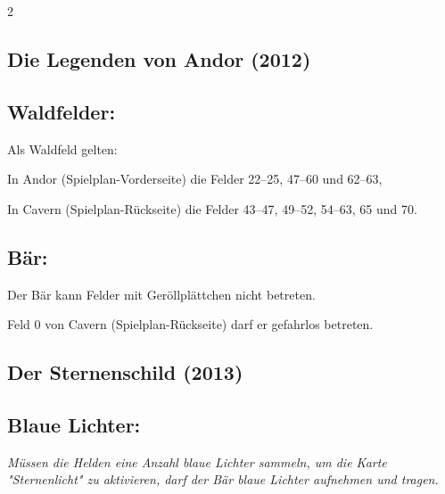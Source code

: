 \documentclass[10pt, a4paper, oneside]{book}
\newcommand{\fan}[1]{\textit{#1}}
\begin{document}
\begin{multicols*}{2}
\columnbreak



\begin{bgcolor}
\section{Die Legenden von Andor (2012)}





\subsection{Waldfelder:}

Als Waldfeld gelten:

\bullet{} In Andor (Spielplan-Vorderseite) die Felder 22–25, 47–60 und 62–63,
\supercite{232}

\bullet{} In Cavern (Spielplan-Rückseite) die Felder 43–47, 49–52, 54–63, 65 und 70.
\supercite{17913}




\subsection{Bär:}

Der Bär kann Felder mit Geröllplättchen nicht betreten.

Feld 0 von Cavern (Spielplan-Rückseite) darf er gefahrlos betreten.







\end{bgcolor}




\begin{bgcolor}

\section{Der Sternenschild (2013)}

\subsection{Blaue Lichter:}

\fan{Müssen die Helden eine Anzahl blaue Lichter sammeln, um die Karte "Sternenlicht" zu aktivieren, darf der Bär blaue Lichter aufnehmen und tragen.}


\end{bgcolor}




\end{multicols*}
\end{document}
